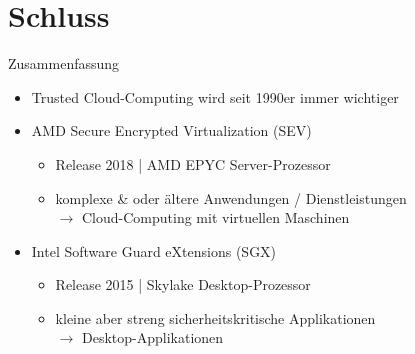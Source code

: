 \documentclass{sdqbeamer}
\begin{document}
\section{Schluss}
\begin{frame}{Zusammenfassung}
	\begin{itemize}
		\item Trusted Cloud-Computing wird seit 1990er immer wichtiger
		\item AMD Secure Encrypted Virtualization (SEV)
		\begin{itemize}
			\item Release 2018 | AMD EPYC Server-Prozessor
			\item komplexe \& oder ältere Anwendungen / Dienstleistungen\\
				\(\rightarrow\) Cloud-Computing mit virtuellen Maschinen
		\end{itemize}
		\item Intel Software Guard eXtensions (SGX)
		\begin{itemize}
			\item Release 2015 | Skylake Desktop-Prozessor
			\item kleine aber streng sicherheitskritische Applikationen\\
				\(\rightarrow\) Desktop-Applikationen
		\end{itemize}
	\end{itemize}
\end{frame}


\end{document}
